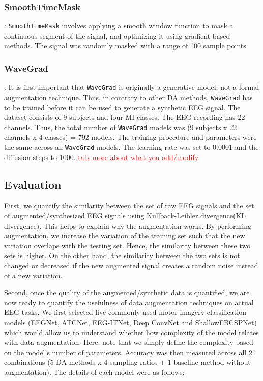 \documentclass[runningheads]{llncs}
\begin{document}
\subsubsection{SmoothTimeMask}:
\texttt{SmoothTimeMask} involves applying a smooth window function to mask a continuous segment of the signal, and optimizing it using gradient-based methods. The signal was randomly masked with a range of 100 sample points.

\subsubsection{WaveGrad}:
It is first important that \texttt{WaveGrad} is originally a generative model, not a formal augmentation technique.  Thus, in contrary to other DA methods, \texttt{WaveGrad} has to be trained before it can be used to generate a synthetic EEG signal.   The dataset consists of 9 subjects and four MI classes. The EEG recording has 22 channels. Thus, the total number of \texttt{WaveGrad} models was (9 subjects x 22 channels x 4 classes) = 792 models.  The training procedure and parameters were the same across all \texttt{WaveGrad} models. The learning rate was set to 0.0001 and the diffusion steps to 1000.  \textcolor{red}{talk more about what you add/modify}

\subsection{Evaluation}
First, we quantify the similarity between the set of raw EEG signals and the set of augmented/synthesized EEG signals using Kullback-Leibler divergence(KL divergence). This helps to explain why the augmentation works. By performing augmentation, we increase the variation of the training set such that the new variation overlaps with the testing set. Hence, the similarity between these two sets is higher. On the other hand, the similarity between the two sets is not changed or decreased if the new augmented signal creates a random noise instead of a new variation.

Second, once the quality of the augmented/synthetic data is quantified, we are now ready to quantify the usefulness of data augmentation techniques on actual EEG tasks.  We first selected five commonly-used motor imagery classification models (EEGNet, ATCNet, EEG-ITNet, Deep ConvNet and ShallowFBCSPNet) which would allow us to understand whether how complexity of the model relates with data augmentation.  Here, note that we simply define the complexity based on the model's number of parameters. Accuracy was then measured across all 21 combinations (5 DA methods x 4 sampling ratios + 1 baseline method without augmentation).  The details of each model were as follows:
\end{document}
